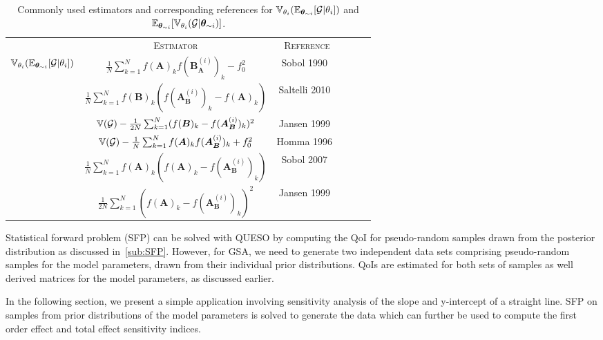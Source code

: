 \begin{table}[htbp]
\centering
\begin{tabular}{@{}*{6}{c}@{}}
\toprule
& \textsc{Estimator} &  \textsc{Reference} \\ 
\cmidrule(r){2-3}\cmidrule(l){4-6} 
\multirow{4}{*}{$\operatorname{\mathbb{V}}_{\theta_{i}}(\operatorname{\mathbb{E}}_{\bm \theta_{\sim i}}[\mathcal{G}\vert\theta_{i}])$} & $\frac{1}{N}\sum_{k=1}^{N} f(\bm A)_{k}f(\bm B_{\bm A}^{(i)})_{k} - f_{0}^{2}$ &  Sobol 1990~\cite{Sobol:1990}  \\
\cmidrule(lr){2-2}\cmidrule(lr){3-3}
& $\frac{1}{N}\sum_{k=1}^{N} f(\bm B)_{k}(f(\bm A_{\bm B}^{(i)})_{k} - f(\bm A)_{k})$ &  Saltelli 2010~\cite{Saltelli:2010} \\
\cmidrule(lr){2-2}\cmidrule(lr){3-3}
& $\operatorname{\mathbb{V}}(\mathcal{G}) - \frac{1}{2N}\sum_{k=1}^{N} (f(\bm B)_{k} - f(\bm A_{\bm B}^{(i)})_{k})^{2}$ & Jansen 1999~\cite{Jansen:1999}   \\
\cmidrule{1-3}
\multirow{3}{*}{$\E_{\bm \theta_{\sim i}}[\V_{\theta_{i}}(\mathcal{G}\vert\bm{\theta}_{\sim i})]$} & $\operatorname{\mathbb{V}}(\mathcal{G}) - \frac{1}{N}\sum_{k=1}^{N} f(\bm A)_{k}f(\bm A_{\bm B}^{(i)})_{k} + f_{0}^{2}$ &  Homma 1996~\cite{Homma:1996}  \\
\cmidrule(lr){2-2}\cmidrule(lr){3-3}
& $\frac{1}{N}\sum_{k=1}^{N} f(\bm A)_{k}(f(\bm A)_{k} - f(\bm A_{\bm B}^{(i)})_{k})$ &  Sobol 2007~\cite{Sobol:2007} \\
\cmidrule(lr){2-2}\cmidrule(lr){3-3}
& $\frac{1}{2N}\sum_{k=1}^{N} (f(\bm A)_{k} - f(\bm A_{\bm B}^{(i)})_{k})^{2}$ & Jansen 1999~\cite{Jansen:1999}   \\
\bottomrule
\end{tabular}
\caption{Commonly used estimators and corresponding references for $\operatorname{\mathbb{V}}_{\theta_{i}}(\operatorname{\mathbb{E}}_{\bm \theta_{\sim i}}[\mathcal{G}\vert\theta_{i}])$ and $\E_{\bm \theta_{\sim i}}[\V_{\theta_{i}}(\mathcal{G}\vert\bm{\theta}_{\sim i})]$.}
\label{tab:estimators}
\end{table}

Statistical forward problem (SFP) can be solved with QUESO by computing the QoI for pseudo-random samples drawn 
from the posterior distribution as discussed in~\ref{sub:SFP}. However, for GSA, we need to generate two independent
data sets comprising pseudo-random samples for the model parameters, drawn from their individual prior distributions. 
QoIs are estimated for both sets of samples as well derived matrices for the model parameters, as discussed earlier. 

In the following section, we present a simple application involving sensitivity analysis of the slope and y-intercept
of a straight line. SFP on samples from prior distributions of the model parameters is solved to generate the data
which can further be used to compute the first order effect and total effect sensitivity indices.  



